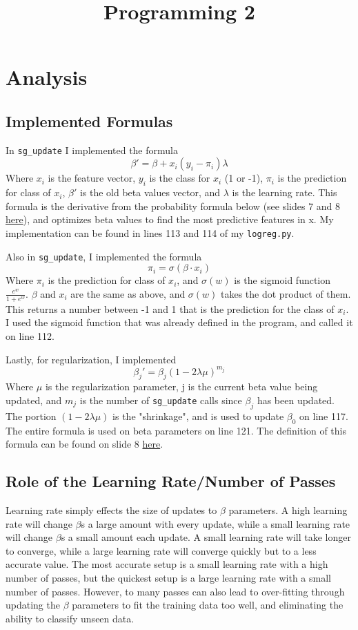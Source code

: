 \documentclass{article}
\title{Programming 2}
\begin{document}
 

\section{Analysis}
\subsection{Implemented Formulas}
In \texttt{sg\_update} I implemented the formula 
\[\beta' = \beta + x_i(y_i - \pi_i)\lambda\]
Where $x_i$ is the feature vector, $y_i$ is the class for $x_i$ (1 or -1), $\pi_i$ is the prediction for class of $x_i$, $\beta'$ is the old beta values vector, and $\lambda$ is the learning rate. This formula is the derivative from the probability formula below (see slides 7 and 8 \href{http://www.umiacs.umd.edu/~alvin/courses/ugml2016/03a.pdf}{here}), and optimizes beta values to find the most predictive features in x. My implementation can be found in lines 113 and 114 of my \texttt{logreg.py}. 

Also in \texttt{sg\_update}, I implemented the formula
\[\pi_i = \sigma(\beta \cdotp x_i)\]
Where $\pi_i$ is the prediction for class of $x_i$, and $\sigma(w)$ is the sigmoid function $\frac{e^w}{1 + e^w}$. $\beta$ and $x_i$ are the same as above, and $\sigma(w)$ takes the dot product of them. This returns a number between -1 and 1 that is the prediction for the class of $x_i$. I used the sigmoid function that was already defined in the program, and called it on line 112. 

Lastly, for regularization, I implemented
\[\beta_j '  = \beta_j (1-2\lambda\mu)^{m_j}\]
Where $\mu$ is the regularization parameter, j is the current beta value being updated, and $m_j$ is the number of \texttt{sg\_update} calls since $\beta_j$ has been updated. The portion $(1-2\lambda\mu)$ is the "shrinkage", and is used to update $\beta_0$ on line 117. The entire formula is used on beta parameters on line 121. The definition of this formula can be found on slide 8 \href{http://www.umiacs.umd.edu/~alvin/courses/ugml2016/03b.pdf}{here}.

\subsection{Role of the Learning Rate/Number of Passes}
Learning rate simply effects the size of updates to $\beta$ parameters. A high learning rate will change $\beta$s a large amount with every update, while a small learning rate will change $\beta$s a small amount each update. A small learning rate will take longer to converge, while a large learning rate will converge quickly but to a less accurate value. The most accurate setup is a small learning rate with a high number of passes, but the quickest setup is a large learning rate with a small number of passes. However, to many passes can also lead to over-fitting through updating the $\beta$ parameters to fit the training data too well, and eliminating the ability to classify unseen data. 
\end{document}
